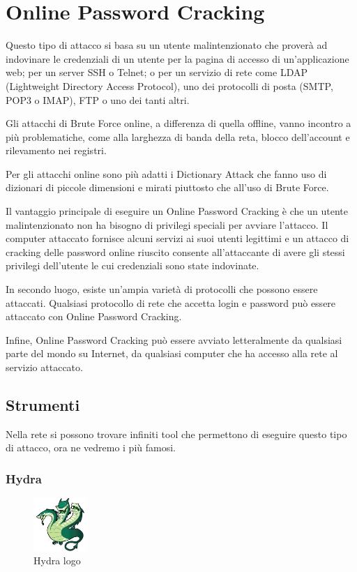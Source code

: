 \chapter{Online Password Cracking}

Questo tipo di attacco si basa su un utente malintenzionato che proverà ad indovinare le credenziali di un utente per la pagina di accesso di un'applicazione web; per un server SSH o Telnet; o per un servizio di rete come LDAP (Lightweight Directory Access Protocol), uno dei protocolli di posta (SMTP, POP3 o IMAP), FTP o uno dei tanti altri.

Gli attacchi di Brute Force online, a differenza di quella offline, vanno incontro a più problematiche, come alla larghezza di banda della reta, blocco dell'account e rilevamento nei registri.

Per gli attacchi online sono più adatti i Dictionary Attack che fanno uso di dizionari di piccole dimensioni e mirati piuttosto che all'uso di Brute Force.

Il vantaggio principale di eseguire un Online Password Cracking è che un utente malintenzionato non ha bisogno di privilegi speciali per avviare l'attacco. Il computer attaccato fornisce alcuni servizi ai suoi utenti legittimi e un attacco di cracking delle password online riuscito consente all'attaccante di avere gli stessi privilegi dell'utente le cui credenziali sono state indovinate.

In secondo luogo, esiste un'ampia varietà di protocolli che possono essere attaccati. Qualsiasi protocollo di rete che accetta login e password può essere attaccato con Online Password Cracking.

Infine, Online Password Cracking può essere avviato letteralmente da qualsiasi parte del mondo su Internet, da qualsiasi computer che ha accesso alla rete al servizio attaccato.

\section{Strumenti}

Nella rete si possono trovare infiniti tool che permettono di eseguire questo tipo di attacco, ora ne vedremo i più famosi.

\subsection{Hydra}

\begin{figure}[htpb!]
    \centering
    \includegraphics[width=20mm]{Immagini/5/hydra.jpg}
    \caption{Hydra logo}
    \label{fig:Hydra esempio}
\end{figure}

